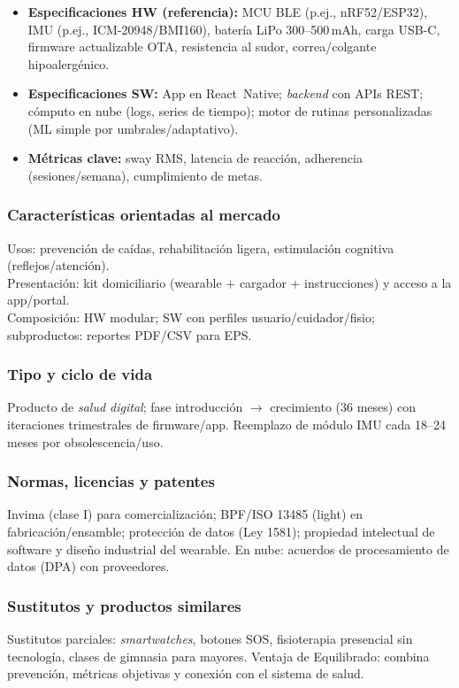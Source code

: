 \begin{itemize}
    \item \textbf{Especificaciones HW (referencia):} MCU BLE (p.ej., nRF52/ESP32), IMU (p.ej., ICM-20948/BMI160), batería LiPo 300--500\,mAh, carga USB-C, firmware actualizable OTA, resistencia al sudor, correa/colgante hipoalergénico.
    \item \textbf{Especificaciones SW:} App en React~Native; \emph{backend} con APIs REST; cómputo en nube (logs, series de tiempo); motor de rutinas personalizadas (ML simple por umbrales/adaptativo).
    \item \textbf{Métricas clave:} sway RMS, latencia de reacción, adherencia (sesiones/semana), cumplimiento de metas.
\end{itemize}

\subsubsection{Características orientadas al mercado}
Usos: prevención de caídas, rehabilitación ligera, estimulación cognitiva (reflejos/atención).\\
Presentación: kit domiciliario (wearable + cargador + instrucciones) y acceso a la app/portal.\\
Composición: HW modular; SW con perfiles usuario/cuidador/fisio; subproductos: reportes PDF/CSV para EPS.

\subsubsection{Tipo y ciclo de vida}
Producto de \emph{salud digital}; fase introducción $\rightarrow$ crecimiento (36 meses) con iteraciones trimestrales de firmware/app. Reemplazo de módulo IMU cada 18--24 meses por obsolescencia/uso.

\subsubsection{Normas, licencias y patentes}
Invima (clase I) para comercialización; BPF/ISO 13485 (light) en fabricación/ensamble; protección de datos (Ley 1581); propiedad intelectual de software y diseño industrial del wearable. En nube: acuerdos de procesamiento de datos (DPA) con proveedores.

\subsubsection{Sustitutos y productos similares}
Sustitutos parciales: \emph{smartwatches}, botones SOS, fisioterapia presencial sin tecnología, clases de gimnasia para mayores. Ventaja de Equilibrado: combina prevención, métricas objetivas y conexión con el sistema de salud.

